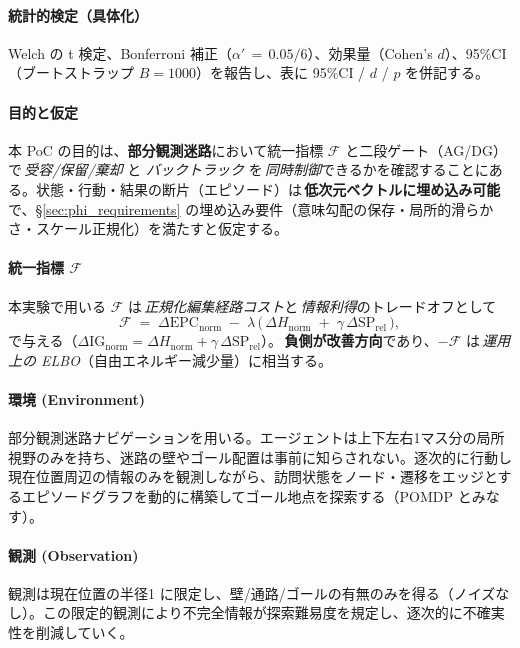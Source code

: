 \documentclass[ja=standard,xelatex]{bxjsarticle}
\newcommand{\F}{\mathcal{F}}
\begin{document}
\paragraph{統計的検定（具体化）}\label{sec:statistical_testing_maze}
Welch の t 検定、Bonferroni 補正（$\alpha'\,{=}\,0.05/6$）、効果量（Cohen's $d$）、95\%CI（ブートストラップ $B{=}1000$）を報告し、表に 95\%CI / $d$ / $p$ を併記する。

\paragraph{目的と仮定}
本 PoC の目的は、\textbf{部分観測迷路}において統一指標 $\F$ と二段ゲート（AG/DG）で\,\emph{受容/保留/棄却} と \emph{バックトラック} を\,\emph{同時制御}できるかを確認することにある。状態・行動・結果の断片（エピソード）は\,\textbf{低次元ベクトルに埋め込み可能}で、\S\ref{sec:phi_requirements} の埋め込み要件（意味勾配の保存・局所的滑らかさ・スケール正規化）を満たすと仮定する。

\paragraph{統一指標 $\boldsymbol{\F}$}
本実験で用いる $\F$ は\,\emph{正規化編集経路コスト}と\,\emph{情報利得}のトレードオフとして
\begin{equation}
  \F\;=\;\Delta\mathrm{EPC}_{\mathrm{norm}}\; -\; \lambda\,\Big(\,\Delta H_{\mathrm{norm}}\; +\; \gamma\,\Delta\mathrm{SP}_{\mathrm{rel}}\,\Big),
  \label{eq:maze_F_definition}
\end{equation}
で与える（$\Delta\mathrm{IG}_{\mathrm{norm}}=\Delta H_{\mathrm{norm}}+\gamma\,\Delta\mathrm{SP}_{\mathrm{rel}}$）。\,\textbf{負側が改善方向}であり、$-\F$ は\,\emph{運用上の ELBO}（自由エネルギー減少量）に相当する。

\paragraph{環境 (Environment)}
部分観測迷路ナビゲーションを用いる。エージェントは上下左右1マス分の局所視野のみを持ち、迷路の壁やゴール配置は事前に知らされない。逐次的に行動し現在位置周辺の情報のみを観測しながら、訪問状態をノード・遷移をエッジとするエピソードグラフを動的に構築してゴール地点を探索する（POMDP とみなす）。

\paragraph{観測 (Observation)}
観測は現在位置の半径1 に限定し、壁/通路/ゴールの有無のみを得る（ノイズなし）。この限定的観測により不完全情報が探索難易度を規定し、逐次的に不確実性を削減していく。
\end{document}
